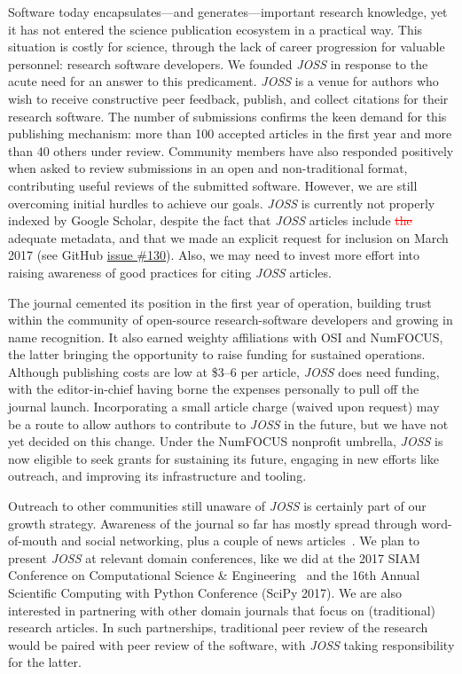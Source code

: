 \documentclass{article}
\newcommand{\delete}[1]{\sloppy\cbcolor{red}\textcolor{red}{\cbdelete \sout{#1}}}
\newcommand\joss{\textit{JOSS}}
\begin{document}
Software today encapsulates---and generates---important research knowledge, yet
it has not entered the science publication ecosystem in a practical way.
This situation is costly for science, through the lack of career progression for
valuable personnel: research software developers.
We founded \joss{} in response to the acute need for an answer to this predicament.
\joss{} is a venue for authors who wish to receive constructive peer feedback,
publish, and collect citations for their research software.
The number of submissions confirms the keen demand for this publishing mechanism:
more than 100 accepted articles in the first year and more than 40 others under review.
Community members have also responded positively when asked to review submissions
in an open and non-traditional format, contributing useful reviews of the submitted software.
However, we are still overcoming initial hurdles to achieve our goals. \joss{} is
currently not properly indexed by Google Scholar, despite the fact that \joss{}
articles include \delete{the} adequate metadata, and that we made an explicit request for
inclusion on March 2017 (see GitHub \href{https://github.com/openjournals/joss/issues/130}{issue \#130}).
Also, we may need to invest more effort into raising awareness of good practices
for citing \joss{} articles.

The journal cemented its position in the first year of operation, building trust within the community of open-source research-software developers and growing in name recognition.
It also earned weighty affiliations with OSI and NumFOCUS, the latter bringing the opportunity to raise funding for sustained operations.
Although publishing costs are low at \$3--6 per article, \joss{} does need funding, with the editor-in-chief having borne the expenses personally to pull off the journal launch.
Incorporating a small article charge (waived upon request) may be a route to allow authors to contribute to \joss{} in the future, but we have not yet decided on this change.
Under the NumFOCUS nonprofit umbrella, \joss{} is now eligible to seek grants for sustaining its future, engaging in new efforts like outreach, and improving its infrastructure and tooling.

Outreach to other communities still unaware of \joss{} is certainly part of our growth strategy.
Awareness of the journal so far has mostly spread through word-of-mouth and social networking, plus a couple of news articles~\cite{Nature:joss,SDtimes:joss}.
We plan to present \joss{} at relevant domain conferences,
like we did at the 2017 SIAM Conference
on Computational Science \& Engineering~\cite{JOSS-CSE-poster} and the 16th Annual Scientific Computing with Python Conference (SciPy 2017).
We are also interested in partnering
with other domain journals that focus on (traditional) research articles.
In such partnerships,
traditional peer review of the research would be paired with peer review of the software, with \joss{} taking responsibility for the latter.
\end{document}
